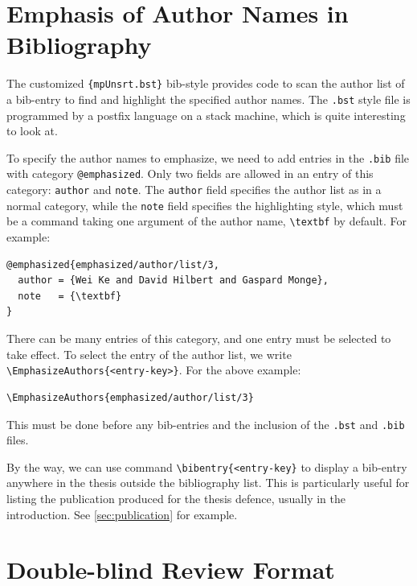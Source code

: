 \section{Emphasis of Author Names in Bibliography}

The customized \verb|{mpUnsrt.bst}| bib-style provides code to scan the author list of a bib-entry to find and highlight the specified author names.
The \verb|.bst| style file is programmed by a postfix language on a stack machine, which is quite interesting to look at.

To specify the author names to emphasize, we need to add entries in the \verb|.bib| file with category \verb|@emphasized|.
Only two fields are allowed in an entry of this category: \verb|author| and \verb|note|.
The \verb|author| field specifies the author list as in a normal category, while the \verb|note| field specifies the highlighting style,
which must be a command taking one argument of the author name, \verb|\textbf| by default. For example:
\begin{verbatim}
@emphasized{emphasized/author/list/3,
  author = {Wei Ke and David Hilbert and Gaspard Monge},
  note   = {\textbf}
}
\end{verbatim}

There can be many entries of this category, and one entry must be selected to take effect.
To select the entry of the author list, we write \verb|\EmphasizeAuthors{<entry-key>}|. For the above example:
\begin{verbatim}
\EmphasizeAuthors{emphasized/author/list/3}
\end{verbatim}
This must be done before any bib-entries and the inclusion of the \verb|.bst| and \verb|.bib| files.

By the way, we can use command \verb|\bibentry{<entry-key}| to display a bib-entry anywhere in the thesis outside the bibliography list.
This is particularly useful for listing the publication produced for the thesis defence, usually in the introduction. See \autoref{sec:publication} for example.

\section{Double-blind Review Format}

